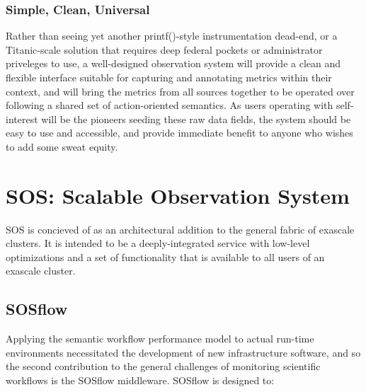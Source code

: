 \subsubsection{Simple, Clean, Universal}
Rather than seeing yet another printf()-style instrumentation
dead-end, or a Titanic-scale solution that requires deep federal
pockets or administrator priveleges to use, a well-designed
observation system will provide a clean and flexible interface
suitable for capturing and annotating metrics within their context,
and will bring the metrics from all sources together to be operated
over following a shared set of action-oriented semantics. As users
operating with self-interest will be the pioneers seeding these raw
data fields, the system should be easy to use and accessible, and
provide immediate benefit to anyone who wishes to add some sweat
equity.




\section{SOS: Scalable Observation System}

SOS is concieved of as an architectural addition to the general fabric of
exascale clusters. It is intended to be a deeply-integrated service with low-level
optimizations and a set of functionality that is available to all users of an exascale
cluster.


\subsection{SOSflow}
Applying the semantic workflow performance model to actual
run-time environments necessitated the development of new
infrastructure software, and so the second contribution to the general
challenges of monitoring scientific workflows is the SOSflow middleware.
SOSflow is designed to:

